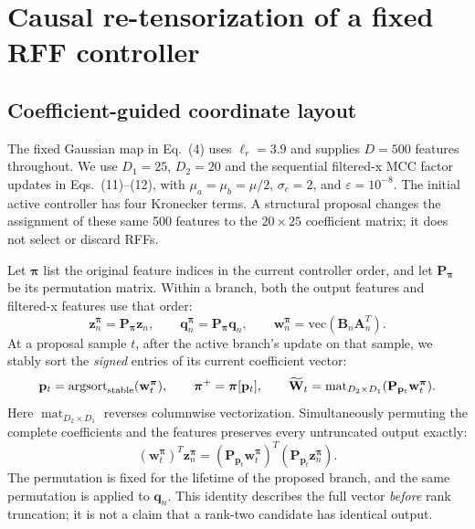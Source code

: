 \section{Causal re-tensorization of a fixed RFF controller}
\label{sec:n14_method}

\subsection{Coefficient-guided coordinate layout}
The fixed Gaussian map in Eq.~(4) uses $\ell_r=3.9$ and supplies $D=500$
features throughout.  We use
$D_1=25$, $D_2=20$ and the sequential filtered-x MCC factor updates in
Eqs.~(11)--(12), with $\mu_a=\mu_b=\mu/2$, $\sigma_c=2$, and
$\varepsilon=10^{-8}$.  The initial active controller has four Kronecker
terms.  A structural proposal changes the assignment of these same 500
features to the $20\times25$ coefficient matrix; it does not select or
discard RFFs.

Let $\boldsymbol\pi$ list the original feature indices in the current
controller order, and let $\mathbf{P}_{\boldsymbol\pi}$ be its permutation
matrix.  Within a branch, both the output features and filtered-x features
use that order:
\begin{equation}
 \mathbf{z}^{\boldsymbol\pi}_n=\mathbf{P}_{\boldsymbol\pi}\mathbf{z}_n,
 \qquad
 \mathbf{q}^{\boldsymbol\pi}_n=\mathbf{P}_{\boldsymbol\pi}\mathbf{q}_n,
 \qquad
 \mathbf{w}^{\boldsymbol\pi}_n
   =\mathrm{vec}(\mathbf{B}_n\mathbf{A}_n^T).
 \label{eq:n14_permuted_map}
\end{equation}
At a proposal sample $t$, after the active branch's update on that sample,
we stably sort the \emph{signed} entries of its current coefficient vector:
\begin{equation}
 \mathbf{p}_t=\operatorname{argsort}_{\rm stable}
       (\mathbf{w}^{\boldsymbol\pi}_t),\qquad
 \boldsymbol\pi^+=\boldsymbol\pi[\mathbf{p}_t],\qquad
 \widetilde{\mathbf W}_t
   =\operatorname{mat}_{D_2\times D_1}
       (\mathbf{P}_{\mathbf p_t}\mathbf{w}^{\boldsymbol\pi}_t).
 \label{eq:n14_sort}
\end{equation}
Here $\operatorname{mat}_{D_2\times D_1}$ reverses columnwise
vectorization.  Simultaneously permuting the complete coefficients and the
features preserves every untruncated output exactly:
\begin{equation}
 (\mathbf{w}^{\boldsymbol\pi}_t)^T
       \mathbf{z}^{\boldsymbol\pi}_n
 = (\mathbf{P}_{\mathbf p_t}\mathbf{w}^{\boldsymbol\pi}_t)^T
       (\mathbf{P}_{\mathbf p_t}\mathbf{z}^{\boldsymbol\pi}_n).
 \label{eq:n14_invariance}
\end{equation}
The permutation is fixed for the lifetime of the proposed branch, and the
same permutation is applied to $\mathbf q_n$.  This identity describes the
full vector \emph{before} rank truncation; it is not a claim that a rank-two
candidate has identical output.

